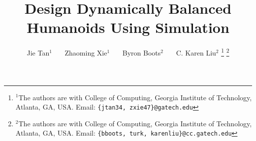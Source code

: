 \documentclass[letterpaper, 10 pt, conference]{ieeeconf}  %
\title{\LARGE \bf
Design Dynamically Balanced Humanoids Using Simulation
}
\author{Jie Tan$^{1}$ ~~~Zhaoming Xie$^{1}$ ~~~Byron Boots$^{2}$
  ~~~C. Karen Liu$^{2}$%
\thanks{$^{1}$The authors are with College of Computing, Georgia Institute of Technology, Atlanta, GA, USA. Email:
        {\tt\small \{jtan34, zxie47\}@gatech.edu}}%
\thanks{$^{2}$The authors are with College of Computing, Georgia Institute of Technology, Atlanta, GA, USA. Email:
        {\tt\small \{bboots, turk, karenliu\}@cc.gatech.edu}}%
}
\begin{document}
\maketitle
\thispagestyle{empty}
\pagestyle{empty}


\begin{abstract}

\end{abstract}











\appendix

\end{document}
